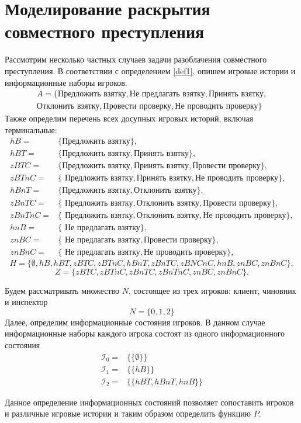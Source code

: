 \section{Моделирование раскрытия совместного преступления}

Рассмотрим несколько частных случаев задачи разоблачения совместного преступления. В соответствии с определением \ref{def1}, опишем игровые истории и информационные наборы игроков.
\begin{align*}
	A = \{\text{Предложить взятку}, \text{Не предлагать взятку}, \text{Принять взятку}, \\ \text{Отклонить взятку}, \text{Провести проверку}, \text{Не проводить проверку} \}
\end{align*}
Также определим перечень всех досупных игровых историй, включая терминальные:
\begin{align*}
hB = & \{\text{Предложить взятку}\}, \\
hBT = & \{\text{Предложить взятку}, \text{Принять взятку}\}, \\
zBTC = & \{\text{Предложить взятку}, \text{Принять взятку}, \text{Провести проверку}\}, \\
zBTnC = & \{\text{ Предложить взятку}, \text{Принять взятку}, \text{Не проводить проверку}\}, \\
hBnT = & \{ \text{Предложить взятку}, \text{Отклонить взятку} \}, \\
zBnTC = & \{\text{ Предложить взятку}, \text{Отклонить взятку}, \text{Провести проверку}\}, \\
zBnTnC = & \{\text{ Предложить взятку}, \text{Отклонить взятку}, \text{Не проводить проверку}\}, \\
hnB = & \{\text{ Не предлагать взятку}\}, \\
znBC = & \{\text{ Не предлагать взятку}, \text{Провести проверку}\}, \\
znBnC = & \{\text{ Не предлагать взятку}, \text{Не проводить проверку}\},
\end{align*}
\begin{equation*}
	H = \{\emptyset, hB, hBT, zBTC, zBTnC, hBnT, zBnTC, zBNCnC, hnB, znBC, znBnC\},
\end{equation*}
\begin{equation}
Z = \{zBTC, zBTnC, zBnTC, zBnTnC, znBC, znBnC\}.
\end{equation}
\par
Будем рассматривать множество $N$, состоящее из трех игроков: клиент, чиновник и инспектор
\begin{equation*}
N = \{0, 1, 2\}
\end{equation*}
Далее, определим информационные состояния игроков. В данном случае информационные наборы каждого игрока состоят из одного информационного состояния
\begin{align*}
\mathcal{I}_0 = & \{\{\emptyset\}\} \\
\mathcal{I}_1 = & \{\{hB\}\} \\
\mathcal{I}_2 = & \{\{hBT, hBnT, hnB\}\}
\end{align*}
\par
Данное определение информационных состояний позволяет сопоставить игроков и различные игровые истории и таким образом определить функцию $P$.

